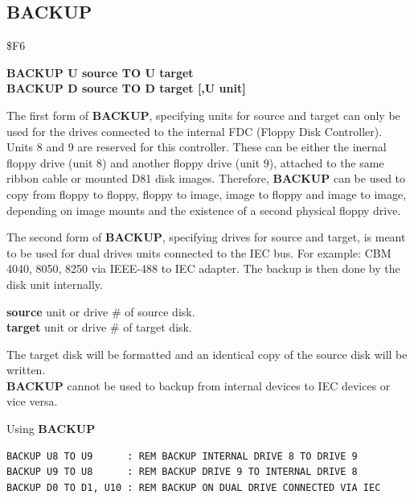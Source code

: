 \subsection{BACKUP}
\begin{description}[leftmargin=2cm,style=nextline]
\item [Token:] \$F6
\item [Format:] {\bf BACKUP U source TO U target} \\
                {\bf BACKUP D source TO D target [,U unit]}
\item [Usage:] The first form of {\bf BACKUP}, specifying
               units for source and target can only be used for the drives
               connected to the internal FDC (Floppy Disk Controller).
               Units 8 and 9 are reserved for this controller.
               These can be either the inernal floppy drive (unit 8) and
               another floppy drive (unit 9), attached to the same ribbon cable
               or mounted D81 disk images. Therefore, {\bf BACKUP} can be used to
               copy from floppy to floppy, floppy to image, image to floppy
               and image to image, depending on image mounts and the existence of
               a second physical floppy drive.

               The second form of {\bf BACKUP}, specifying
               drives for source and target, is meant to be used for
               dual drives units connected to the IEC bus.
   For example: CBM 4040, 8050, 8250 via IEEE-488 to IEC adapter.
   The backup is then done by the disk unit internally.

   {\bf source} unit or drive \# of source disk. \\
   {\bf target} unit or drive \# of target disk.

\item [Remarks:] The target disk will be formatted and
                 an identical copy of the source disk will be written. \\
                 {\bf BACKUP} cannot be used to backup
                 from internal devices to IEC devices or vice versa.

\item [Examples:] Using {\bf BACKUP}

\begin{tcolorbox}[colback=black,coltext=white]
\verbatimfont{\codefont}
\begin{verbatim}
BACKUP U8 TO U9      : REM BACKUP INTERNAL DRIVE 8 TO DRIVE 9
BACKUP U9 TO U8      : REM BACKUP DRIVE 9 TO INTERNAL DRIVE 8
BACKUP D0 TO D1, U10 : REM BACKUP ON DUAL DRIVE CONNECTED VIA IEC
\end{verbatim}
\end{tcolorbox}
\end{description}

